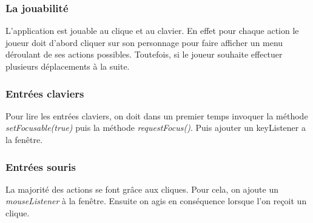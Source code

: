 \documentclass[a4paper,12pt]{article} %
\begin{document}
\subsubsection{La jouabilité}
L'application est jouable au clique et au clavier. En effet pour chaque action le joueur doit d'abord cliquer sur son personnage pour faire afficher un menu déroulant de ses actions possibles. Toutefois, si le joueur souhaite effectuer plusieurs déplacements à la suite.
\subsubsection{Entrées claviers}
Pour lire les entrées claviers, on doit dans un premier temps invoquer la méthode \textit{setFocusable(true)} puis la méthode \textit{requestFocus()}. Puis ajouter un keyListener a la fenêtre. 
\subsubsection{Entrées souris}
La majorité des actions se font grâce aux cliques. Pour cela, on ajoute un \textit{mouseListener} à la fenêtre. Ensuite on agis en conséquence lorsque l'on reçoit un clique.
\end{document}
